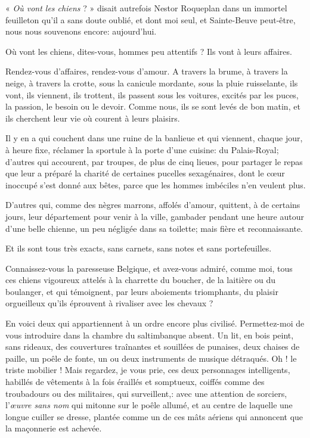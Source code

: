 « \textit{Où vont les chiens} ? » disait autrefois Nestor Roqueplan dans un
immortel feuilleton qu’il a sans doute oublié, et dont
moi seul, et Sainte{}-Beuve peut{}-être, nous nous souvenons encore:
aujourd’hui.

Où vont les chiens, dites{}-vous, hommes peu attentifs ? Ils vont à
leurs affaires.

Rendez{}-vous d’affaires, rendez{}-vous
d’amour. A travers la brume, à travers la neige, à
travers la crotte, sous la canicule mordante, sous la pluie
ruisselante, ils vont, ils viennent, ils trottent, ils passent sous les
voitures, excités par les puces, la passion, le besoin ou le devoir.
Comme nous, ils se sont levés de bon matin, et ils cherchent leur vie
où courent à leurs plaisirs.

Il y en a qui couchent dans une ruine de la banlieue et qui viennent,
chaque jour, à heure fixe, réclamer la sportule à la porte
d’une cuisine: du Palais{}-Royal;
d’autres qui accourent, par troupes, de plus de cinq
lieues, pour partager le repas que leur a préparé la charité de
certaines pucelles sexagénaires, dont le c\oe ur inoccupé
s’est donné aux bêtes, parce que les hommes imbéciles
n’en veulent plus.

D’autres qui, comme des nègres marrons, affolés
d’amour, quittent, à de certains jours, leur
département pour venir à la ville, gambader pendant une heure autour
d’une belle chienne, un peu négligée dans sa toilette;
mais fière et reconnaissante.

Et ils sont tous très exacts, sans carnets, sans notes et sans
portefeuilles.

Connaissez{}-vous la paresseuse Belgique, et avez{}-vous admiré, comme
moi, tous ces chiens vigoureux attelés à la charrette du boucher, de la
laitière ou du boulanger, et qui témoignent, par leurs aboiements
triomphants, du plaisir orgueilleux qu’ils éprouvent à
rivaliser avec les chevaux ?

En voici deux qui appartiennent à un ordre encore plus civilisé.
Permettez{}-moi de vous introduire dans la chambre du saltimbanque
absent. Un lit, en bois peint, sans rideaux, des couvertures traînantes
et souillées de punaises, deux chaises de paille, un poêle de fonte, un
ou deux instruments de musique détraqués. Oh ! le triste mobilier !
Mais regardez, je vous prie, ces deux personnages intelligents,
habillés de vêtements à la fois éraillés et somptueux, coiffés comme
des troubadours ou des militaires, qui surveillent,: avec une attention
de sorciers, l’\textit{\oe uvre sans nom} qui mitonne sur le
poêle allumé, et au centre de laquelle une longue cuiller se dresse,
plantée comme un de ces mâts aériens qui annoncent que la maçonnerie
est achevée. 


